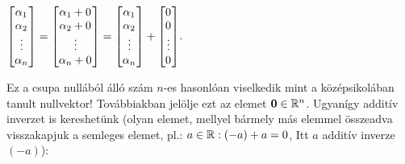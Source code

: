 \documentclass[a4paper,11.5pt]{article}
\begin{document}
	\begin{center}
		$\begin{bmatrix}
		\alpha_{1}\s \\
		\alpha_{2}\s \\
		\vdots\\
		\alpha_{n}\s \\
	\end{bmatrix}=
	\begin{bmatrix}
	\alpha_{1}+0\s \\
	\alpha_{2}+0\s \\
	\vdots\\
	\alpha_{n}+0\s \\
	\end{bmatrix}=
	\begin{bmatrix}
	\alpha_{1}\s \\
	\alpha_{2}\s \\
	\vdots\\
	\alpha_{n}\s \\
	\end{bmatrix}+
	\begin{bmatrix}
	0\s \\
	0\s \\
	\vdots\\
	0\s \\
	\end{bmatrix}$.
	\end{center}
	\noindent Ez a csupa nullából álló szám $n$-es hasonlóan viselkedik mint a középsikolában tanult nullvektor! Továbbiakban jelölje ezt az elemet $\textbf{0} \in \mathbb{R}^{n}$. Ugyanígy additív inverzet is kereshetünk (olyan elemet, mellyel bármely más elemmel összeadva visszakapjuk a semleges elemet, pl.: $a \in \mathbb{R}: (-a)+a=0$, Itt $a$ additív inverze $(-a)$):
	
\end{document}
